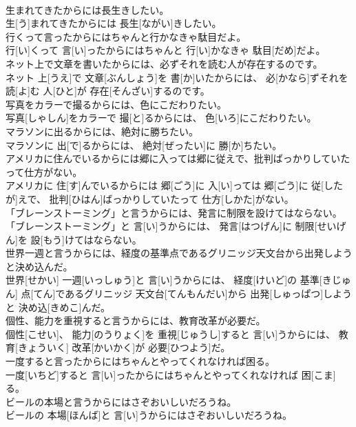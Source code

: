 \documentclass[8pt]{extreport}
\begin{document}
\begin{CJK}{UTF8}{min}
\\	生まれてきたからには長生きしたい。	
\\	生[う]まれてきたからには 長生[ながい]きしたい。
\\	行くって言ったからにはちゃんと行かなきゃ駄目だよ。	
\\	行[い]くって 言[い]ったからにはちゃんと 行[い]かなきゃ 駄目[だめ]だよ。
\\	ネット上で文章を書いたからには、必ずそれを読む人が存在するのです。	
\\	ネット 上[うえ]で 文章[ぶんしょう]を 書[か]いたからには、 必[かなら]ずそれを 読[よ]む 人[ひと]が 存在[そんざい]するのです。
\\	写真をカラーで撮るからには、色にこだわりたい。	
\\	写真[しゃしん]をカラーで 撮[と]るからには、 色[いろ]にこだわりたい。
\\	マラソンに出るからには、絶対に勝ちたい。	
\\	マラソンに 出[で]るからには、 絶対[ぜったい]に 勝[か]ちたい。
\\	アメリカに住んでいるからには郷に入っては郷に従えで、批判ばっかりしていたって仕方がない。	
\\	アメリカに 住[す]んでいるからには 郷[ごう]に 入[い]っては 郷[ごう]に 従[したが]えで、 批判[ひはん]ばっかりしていたって 仕方[しかた]がない。
\\	「ブレーンストーミング」と言うからには、発言に制限を設けてはならない。	
\\	「ブレーンストーミング」と 言[い]うからには、 発言[はつげん]に 制限[せいげん]を 設[もう]けてはならない。
\\	世界一週と言うからには、経度の基準点であるグリニッジ天文台から出発しようと決め込んだ。	
\\	世界[せかい] 一週[いっしゅう]と 言[い]うからには、 経度[けいど]の 基準[きじゅん] 点[てん]であるグリニッジ 天文台[てんもんだい]から 出発[しゅっぱつ]しようと 決め込[きめこ]んだ。
\\	個性、能力を重視すると言うからには、教育改革が必要だ。	
\\	個性[こせい]、 能力[のうりょく]を 重視[じゅうし]すると 言[い]うからには、 教育[きょういく] 改革[かいかく]が 必要[ひつよう]だ。
\\	一度すると言ったからにはちゃんとやってくれなければ困る。	
\\	一度[いちど]すると 言[い]ったからにはちゃんとやってくれなければ 困[こま]る。
\\	ビールの本場と言うからにはさぞおいしいだろうね。	
\\	ビールの 本場[ほんば]と 言[い]うからにはさぞおいしいだろうね。

\end{CJK}
\end{document}
